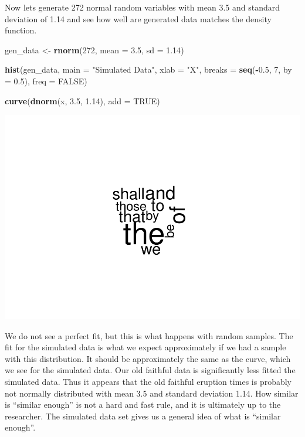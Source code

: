 \documentclass[
]{book}
\newenvironment{Shaded}{\begin{snugshade}}{\end{snugshade}}
\newcommand{\DataTypeTok}[1]{\textcolor[rgb]{0.13,0.29,0.53}{#1}}
\newcommand{\DecValTok}[1]{\textcolor[rgb]{0.00,0.00,0.81}{#1}}
\newcommand{\FloatTok}[1]{\textcolor[rgb]{0.00,0.00,0.81}{#1}}
\newcommand{\KeywordTok}[1]{\textcolor[rgb]{0.13,0.29,0.53}{\textbf{#1}}}
\newcommand{\NormalTok}[1]{#1}
\newcommand{\OperatorTok}[1]{\textcolor[rgb]{0.81,0.36,0.00}{\textbf{#1}}}
\newcommand{\OtherTok}[1]{\textcolor[rgb]{0.56,0.35,0.01}{#1}}
\newcommand{\StringTok}[1]{\textcolor[rgb]{0.31,0.60,0.02}{#1}}
\begin{document}
Now lets generate 272 normal random variables with mean 3.5 and standard deviation of 1.14 and see how well are generated data matches the density function.

\begin{Shaded}
\begin{Highlighting}[]
\NormalTok{gen_data <-}\StringTok{ }\KeywordTok{rnorm}\NormalTok{(}\DecValTok{272}\NormalTok{, }\DataTypeTok{mean =} \FloatTok{3.5}\NormalTok{, }\DataTypeTok{sd =} \FloatTok{1.14}\NormalTok{)}

\KeywordTok{hist}\NormalTok{(gen_data, }\DataTypeTok{main =} \StringTok{"Simulated Data"}\NormalTok{, }\DataTypeTok{xlab =} \StringTok{"X"}\NormalTok{, }\DataTypeTok{breaks =} \KeywordTok{seq}\NormalTok{(}\OperatorTok{-}\FloatTok{0.5}\NormalTok{,}
    \DecValTok{7}\NormalTok{, }\DataTypeTok{by =} \FloatTok{0.5}\NormalTok{), }\DataTypeTok{freq =} \OtherTok{FALSE}\NormalTok{)}

\KeywordTok{curve}\NormalTok{(}\KeywordTok{dnorm}\NormalTok{(x, }\FloatTok{3.5}\NormalTok{, }\FloatTok{1.14}\NormalTok{), }\DataTypeTok{add =} \OtherTok{TRUE}\NormalTok{)}
\end{Highlighting}
\end{Shaded}

\includegraphics{_main_files/figure-latex/unnamed-chunk-226-1.pdf}

We do not see a perfect fit, but this is what happens with random samples. The fit for the simulated data is what we expect approximately if we had a sample with this distribution. It should be approximately the same as the curve, which we see for the simulated data. Our old faithful data is significantly less fitted the simulated data. Thus it appears that the old faithful eruption times is probably not normally distributed with mean 3.5 and standard deviation 1.14. How similar is ``similar enough'' is not a hard and fast rule, and it is ultimately up to the researcher. The simulated data set gives us a general idea of what is ``similar enough''.
\end{document}
